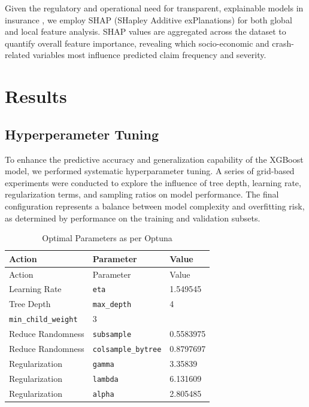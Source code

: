 \documentclass[
  number,
  review,
  3p]{elsarticle}
\begin{document}
Given the regulatory and operational need for transparent, explainable
models in insurance \citep{henckaerts, lundberg}, we employ SHAP
(SHapley Additive exPlanations) for both global and local feature
analysis. SHAP values are aggregated across the dataset to quantify
overall feature importance, revealing which socio-economic and
crash-related variables most influence predicted claim frequency and
severity.

\section{Results}\label{results}

\subsection{\texorpdfstring{\textbf{Hyperperameter
Tuning}}{Hyperperameter Tuning}}\label{hyperperameter-tuning}

To enhance the predictive accuracy and generalization capability of the
XGBoost model, we performed systematic hyperparameter tuning. A series
of grid-based experiments were conducted to explore the influence of
tree depth, learning rate, regularization terms, and sampling ratios on
model performance. The final configuration represents a balance between
model complexity and overfitting risk, as determined by performance on
the training and validation subsets.

\begin{longtable}[]{@{}lll@{}}
\caption{Optimal Parameters as per Optuna}\tabularnewline
\toprule\noalign{}
Action & Parameter & Value \\
\midrule\noalign{}
\endfirsthead
\toprule\noalign{}
Action & Parameter & Value \\
\midrule\noalign{}
\endhead
\bottomrule\noalign{}
\endlastfoot
Learning Rate & \texttt{eta} & 1.549545 \\
Tree Depth & \texttt{max\_depth} & 4 \\
\texttt{min\_child\_weight} & 3 & \\
Reduce Randomness & \texttt{subsample} & 0.5583975 \\
Reduce Randomness & \texttt{colsample\_bytree} & 0.8797697 \\
Regularization & \texttt{gamma} & 3.35839 \\
Regularization & \texttt{lambda} & 6.131609 \\
Regularization & \texttt{alpha} & 2.805485 \\
\end{longtable}
\end{document}
